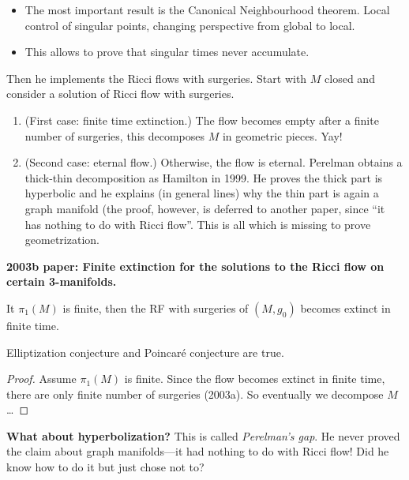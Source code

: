 \begin{itemize}
\item The most important result is the
Canonical Neighbourhood theorem.
Local control of singular points,
changing perspective from global
to local.
\item This allows to prove that singular
times never accumulate.
\end{itemize}

\noindent
Then he implements the Ricci flows with
surgeries. Start with $M$ closed and
consider a solution of Ricci flow with
surgeries.
\begin{enumerate}
\item (First case: finite time extinction.)
The flow becomes empty after a finite number
of surgeries, this decomposes $M$ in
geometric pieces. Yay!
\item (Second case: eternal flow.)
Otherwise, the flow is eternal. Perelman
obtains a thick-thin decomposition as
Hamilton in 1999. He proves the thick part
is hyperbolic and he explains (in general
lines) why the thin part is again a graph
manifold (the proof, however, is deferred to
another paper, since ``it has nothing to do
with Ricci flow''. This is all which is
missing to prove geometrization.
\end{enumerate}

\medskip\noindent
{\bf 2003b paper: Finite extinction
for the solutions to the Ricci flow on
certain 3-manifolds.}

\begin{theorem}
\label{theorem-perelmans-shortcut}
It $\pi_1(M)$ is finite, then the RF with
surgeries of $(M,g_0)$ becomes extinct in
finite time.
\end{theorem}

\begin{corollary}
\label{lemma-elliptization}
Elliptization conjecture and Poincaré
conjecture are true.
\end{corollary}

\begin{proof}
Assume $\pi_1(M)$ is finite.
Since the flow becomes extinct in finite
time, there are only finite number of
surgeries (2003a). So eventually we
decompose $M$…
\end{proof}

\medskip\noindent
{\bf What about hyperbolization?}
This is called {\it Perelman's gap}.
He never proved the claim about graph
manifolds---it had nothing to do with
Ricci flow!
Did he know how to do it but just
chose not to?

